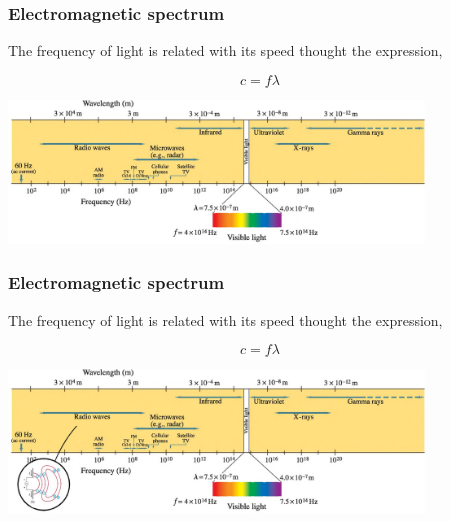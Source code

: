 \documentclass[]{beamer}
\begin{document}
\begin{frame}

\frametitle{Electromagnetic spectrum}

The frequency of light is related with its speed thought the expression,

\begin{equation*}
c=f\lambda
\end{equation*}

  \begin{center}
  \includegraphics[height=1.5in]{images5/spectrum.jpg}
\end{center}



  \end{frame}




\begin{frame}

\frametitle{Electromagnetic spectrum}

The frequency of light is related with its speed thought the expression,

\begin{equation*}
c=f\lambda
\end{equation*}

  \begin{center}
  \includegraphics[height=1.5in]{images5/spectrum2.jpg}
\end{center}



  \end{frame}

\end{document}
